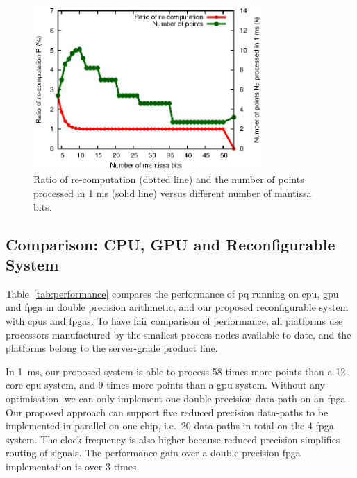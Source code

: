 \begin{figure}[ht]
\begin{center}
\includegraphics[width=0.78\textwidth]{3_precision/figures/fig_recompute}
\end{center}
\caption[Ratio of re-computation and the number of points processed in 1 ms versus different number of mantissa bits.]{Ratio of re-computation (dotted line) and 
the number of points processed in 1 ms (solid line) versus different number of mantissa bits.}
\label{fig:recompute}
\end{figure}


\subsection{Comparison: CPU, GPU and Reconfigurable System}
Table~\ref{tab:performance} compares the performance of \gls{pq} running on \gls{cpu}, \gls{gpu} and \gls{fpga} in double precision arithmetic, 
and our proposed reconfigurable system with \glspl{cpu} and \glspl{fpga}.
To have fair comparison of performance, all platforms use processors manufactured by the smallest process nodes available to date, and the platforms belong to the server-grade product line.


In 1~ms, our proposed system is able to process 58 times more points than a 12-core \gls{cpu} system, and 9 times more points than a \gls{gpu} system.
Without any optimisation, we can only implement one double precision data-path on an \gls{fpga}.
Our proposed approach can support five reduced precision data-paths to be implemented in parallel on one chip, i.e.~20 data-paths in total on the 4-\gls{fpga} system.
The clock frequency is also higher because reduced precision simplifies routing of signals.
The performance gain over a double precision \gls{fpga} implementation is over 3 times.

